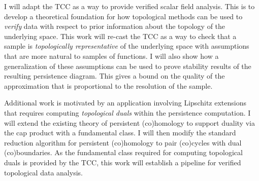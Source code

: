 
I will adapt the TCC as a way to provide verified scalar field analysis.
This is to develop a theoretical foundation for how topological methods can be used to \emph{verify} data with respect to prior information about the topology of the underlying space.
This work will re-cast the TCC as a way to check that a sample is \emph{topologically representative} of the underlying space with assumptions that are more natural to samples of functions.
I will also show how a generalization of these assumptions can be used to prove stability results of the resulting persistence diagram.
This gives a bound on the quality of the approximation that is proportional to the resolution of the sample.

Additional work is motivated by an application involving Lipschitz extensions that requires computing \emph{topological duals} within the persistence computation.
I will extend the existing theory of persistent (co)homology to support duality via the cap product with a fundamental class.
I will then modify the standard reduction algorithm for persistent (co)homology to pair (co)cycles with dual (co)boundaries.
As the fundamental class required for computing topological duals is provided by the TCC, this work will establish a pipeline for verified topological data analysis.
